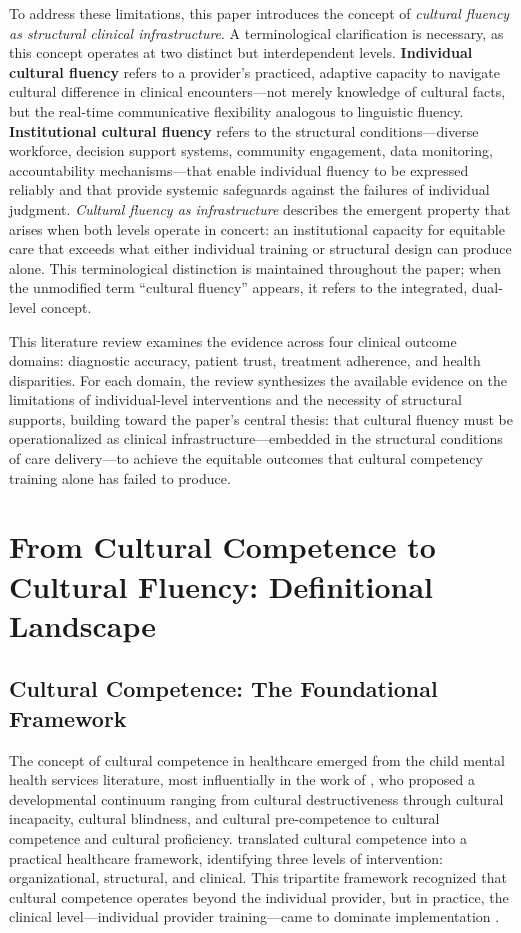 \documentclass[12pt, a4paper]{article}
\begin{document}
To address these limitations, this paper introduces the concept of \textit{cultural fluency as structural clinical infrastructure}. A terminological clarification is necessary, as this concept operates at two distinct but interdependent levels. \textbf{Individual cultural fluency} refers to a provider's practiced, adaptive capacity to navigate cultural difference in clinical encounters---not merely knowledge of cultural facts, but the real-time communicative flexibility analogous to linguistic fluency. \textbf{Institutional cultural fluency} refers to the structural conditions---diverse workforce, decision support systems, community engagement, data monitoring, accountability mechanisms---that enable individual fluency to be expressed reliably and that provide systemic safeguards against the failures of individual judgment. \textit{Cultural fluency as infrastructure} describes the emergent property that arises when both levels operate in concert: an institutional capacity for equitable care that exceeds what either individual training or structural design can produce alone. This terminological distinction is maintained throughout the paper; when the unmodified term ``cultural fluency'' appears, it refers to the integrated, dual-level concept.

This literature review examines the evidence across four clinical outcome domains: diagnostic accuracy, patient trust, treatment adherence, and health disparities. For each domain, the review synthesizes the available evidence on the limitations of individual-level interventions and the necessity of structural supports, building toward the paper's central thesis: that cultural fluency must be operationalized as clinical infrastructure---embedded in the structural conditions of care delivery---to achieve the equitable outcomes that cultural competency training alone has failed to produce.

\section{From Cultural Competence to Cultural Fluency: Definitional Landscape}

\subsection{Cultural Competence: The Foundational Framework}

The concept of cultural competence in healthcare emerged from the child mental health services literature, most influentially in the work of \citet{cross1989}, who proposed a developmental continuum ranging from cultural destructiveness through cultural incapacity, cultural blindness, and cultural pre-competence to cultural competence and cultural proficiency. \citet{betancourt2003} translated cultural competence into a practical healthcare framework, identifying three levels of intervention: organizational, structural, and clinical. This tripartite framework recognized that cultural competence operates beyond the individual provider, but in practice, the clinical level---individual provider training---came to dominate implementation \citep{jernigan2016, dogra2009}.
\end{document}
